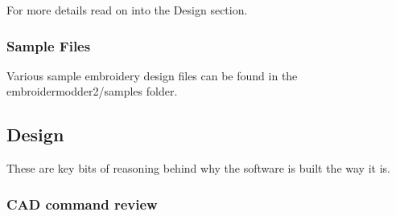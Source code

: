 \documentclass[a4paper, 11pt]{report}
\begin{document}
For more details read on into the Design section.

\subsubsection{Sample Files}

Various sample embroidery design files can be found in the embroidermodder2/samples folder.

\subsection{Design}

These are key bits of reasoning behind why the software is built the way it is.

\subsubsection{CAD command review}
\end{document}
